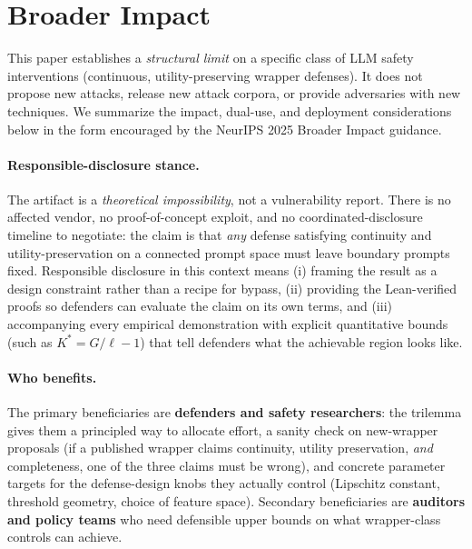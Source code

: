 
\section*{Broader Impact}
\label{sec:broader-impact}

This paper establishes a \emph{structural limit} on a specific class
of LLM safety interventions (continuous, utility-preserving wrapper
defenses). It does not propose new attacks, release new attack
corpora, or provide adversaries with new techniques. We summarize the
impact, dual-use, and deployment considerations below in the form
encouraged by the NeurIPS 2025 Broader Impact guidance.

\paragraph{Responsible-disclosure stance.}
The artifact is a \emph{theoretical impossibility}, not a
vulnerability report. There is no affected vendor, no proof-of-concept
exploit, and no coordinated-disclosure timeline to negotiate: the
claim is that \emph{any} defense satisfying continuity and
utility-preservation on a connected prompt space must leave boundary
prompts fixed. Responsible disclosure in this context means (i)
framing the result as a design constraint rather than a recipe for
bypass, (ii) providing the Lean-verified proofs so defenders can
evaluate the claim on its own terms, and (iii) accompanying every
empirical demonstration with explicit quantitative bounds (such as
$K^{*} = G/\ell - 1$) that tell defenders what the achievable region
looks like.

\paragraph{Who benefits.}
The primary beneficiaries are \textbf{defenders and safety
researchers}: the trilemma gives them a principled way to allocate
effort, a sanity check on new-wrapper proposals (if a published
wrapper claims continuity, utility preservation, \emph{and}
completeness, one of the three claims must be
wrong), and concrete parameter targets for the defense-design knobs
they actually control (Lipschitz constant, threshold geometry,
choice of feature space). Secondary beneficiaries are
\textbf{auditors and policy teams} who need defensible upper bounds
on what wrapper-class controls can achieve.

